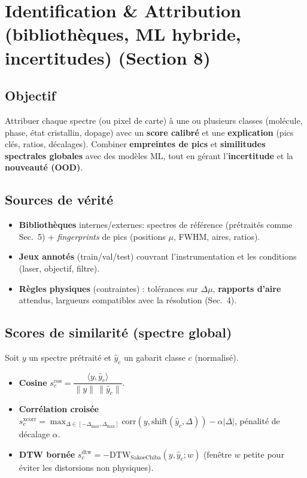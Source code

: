 
\section{Identification \& Attribution (bibliothèques, ML hybride, incertitudes) (Section 8)}

\subsection{Objectif}
Attribuer chaque spectre (ou pixel de carte) à une ou plusieurs classes (molécule, phase, état cristallin, dopage) avec un \textbf{score calibré} et une \textbf{explication} (pics clés, ratios, décalages). Combiner \textbf{empreintes de pics} et \textbf{similitudes spectrales globales} avec des modèles ML, tout en gérant l'\textbf{incertitude} et la \textbf{nouveauté (OOD)}.

\subsection{Sources de vérité}
\begin{itemize}[nosep]
\item \textbf{Bibliothèques} internes/externes: spectres de référence (prétraités comme Sec.~5) + \emph{fingerprints} de pics (positions $\mu$, FWHM, aires, ratios).
\item \textbf{Jeux annotés} (train/val/test) couvrant l'instrumentation et les conditions (laser, objectif, filtre).
\item \textbf{Règles physiques} (contraintes) : tolérances sur $\Delta\mu$, \textbf{rapports d'aire} attendus, largueurs compatibles avec la résolution (Sec.~4).
\end{itemize}

\subsection{Scores de similarité (spectre global)}
Soit $y$ un spectre prétraité et $\hat{y}_c$ un gabarit classe $c$ (normalisé).
\begin{itemize}[nosep]
\item \textbf{Cosine} $s_c^{\cos}=\dfrac{\langle y,\hat{y}_c\rangle}{\|y\|\,\|\hat{y}_c\|}$.
\item \textbf{Corrélation croisée} $s_c^{\mathrm{xcorr}}=\max_{\Delta\in[-\Delta_{\max},\Delta_{\max}]}\mathrm{corr}(y,\mathrm{shift}(\hat{y}_c,\Delta)) - \alpha|\Delta|$, pénalité de décalage $\alpha$.
\item \textbf{DTW bornée} $s_c^{\mathrm{dtw}}=-\mathrm{DTW}_\mathrm{SakoeChiba}(y,\hat{y}_c;w)$ (fenêtre $w$ petite pour éviter les distorsions non physiques).
\end{itemize}

